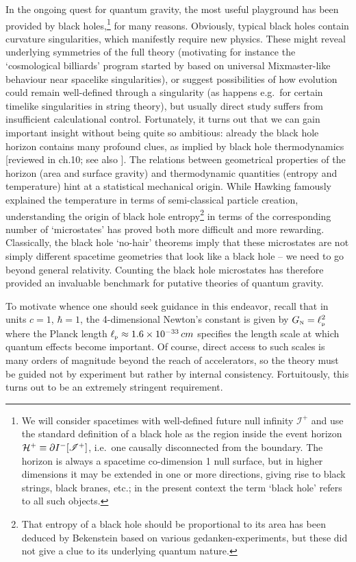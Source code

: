 \documentclass[12pt,a4paper]{article}
\def\GR{general relativity}
\def\QG{quantum gravity}
\def\GN{G_{\scriptscriptstyle {\rm N}}}
\def\lpl{\ell_{\scriptscriptstyle {\rm p}}}
\def\scri{\mathscr I}
\begin{document}
In the ongoing quest for \QG, the most useful playground has been provided by black holes,\footnote{
We will consider spacetimes with well-defined future null infinity $\scri^+$ and use the standard definition of a black hole as the region inside the event horizon ${\cal H}^+ \equiv \partial I^-[\scri^+]$, i.e.\ one causally disconnected from the boundary.  The horizon is always a spacetime co-dimension 1 null surface, but in higher dimensions it may be extended in one or more directions, giving rise to black strings, black branes, etc.;  in the present context the term `black hole' refers to all such objects.
} for many reasons.  Obviously, typical black holes contain curvature singularities, which manifestly require new physics.  These might reveal underlying symmetries of the full theory 
(motivating for instance the `cosmological billiards' program started by \cite{belinskii1982general} based on universal Mixmaster-like behaviour near spacelike singularities), or suggest possibilities of how evolution could remain well-defined through a singularity (as happens  e.g.\ for certain timelike singularities in string theory),
but usually direct study suffers from insufficient calculational control.
Fortunately,
it turns out that we can gain important insight without being quite so ambitious: already the black hole horizon contains many profound clues,  as implied by black hole thermodynamics [reviewed in ch.10; see also \cite{Wald:1999vt}].  The relations between geometrical properties of the horizon (area and surface gravity) and thermodynamic quantities (entropy and temperature)  hint at a statistical mechanical origin. 
While Hawking \cite{hawking1975particle} famously explained the temperature in terms of semi-classical particle creation, understanding the origin of black hole entropy\footnote{
That entropy of a black hole should be proportional to its area has been  deduced by Bekenstein \cite{bekenstein1973black} based on various gedanken-experiments, but these did not give a clue to its underlying quantum nature.
}
 in terms of the corresponding number of  `microstates' has proved both more difficult and more rewarding.  Classically, the black hole `no-hair' theorems  imply that these microstates are not simply different  spacetime geometries that look like a black hole -- we need to go beyond \GR.
 Counting the black hole microstates has therefore provided an invaluable benchmark for putative theories of \QG.

To motivate whence one should seek guidance in this endeavor, recall that
in  units $c=1$, $\hbar =1$, the 4-dimensional Newton's constant is given by $\GN = \lpl^2$ where the Planck length $\lpl \approx 1.6 \times 10^{-33} \, cm$ specifies the length scale at which quantum effects become important. 
 Of course, direct access to such scales  is many orders of magnitude beyond the reach of accelerators, so the theory must be guided not by experiment but rather by internal consistency.  Fortuitously, this turns out to be an extremely stringent requirement.
\end{document}
